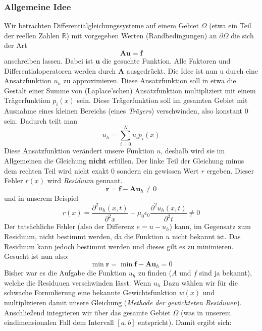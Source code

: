 	\subsubsection{Allgemeine Idee}
	Wir betrachten Differentialgleichungssysteme auf einem Gebiet $\Omega$ (etwa ein Teil der reellen Zahlen $\mathbb{R}$) mit vorgegeben Werten (Randbedingungen) an $\partial \Omega$ die sich der Art 
	\begin{equation}
		\mathbf{A}\mathbf{u}=\mathbf{f}
	\end{equation}
	anschreiben lassen. Dabei ist $\mathbf{u}$ die gesuchte Funktion. Alle Faktoren und Differentialoperatoren werden durch $\mathbf{A}$ ausgedrückt. 
	Die Idee ist nun u durch eine Ansatzfunktion $u_h$ zu approximieren.
	Diese Ansatzfunktion soll in etwa die Gestalt einer Summe von (Laplace'schen) Ansatzfunktion multipliziert mit einem Trägerfunktion $p_i(x)$ sein. Diese Trägerfunktion soll im gesamten Gebiet mit Ausnahme eines kleinen Bereichs (eines \textit{Trägers}) verschwinden, also konstant 0 sein. Dadurch teilt man 
	\begin{equation}
		u_h = \sum_{i=0}^N u_i p_i(x)
	\end{equation}
	Diese Ansatzfunktion verändert unsere Funktion $u$, deshalb wird sie im Allgemeinen die Gleichung \textbf{nicht} erfüllen. Der linke Teil der Gleichung minus dem rechten Teil wird nicht exakt 0 sondern ein gewissen Wert $r$ ergeben. Dieser Fehler $r(x)$ wird \textit{Residuum} gennant.
	\begin{equation}
	\mathbf{r} =\mathbf{f}-\mathbf{A}\mathbf{u}_h \neq 0 \tag{allgemein}
	\end{equation}
	und in unserem Beispiel
	\begin{equation}
		r(x) =\frac{\partial^2 u_h(x,t)}{\partial ^2 x} - \mu_0 \epsilon_0 \frac{\partial ^2 u_h (x,t)}{\partial^2 t} \neq 0 
	\end{equation}
	Der tatsächliche Fehler (also der Differenz  $e=u-u_h$) kann, im Gegensatz zum Residuum, nicht bestimmt werden, da die Funktion $u$ nicht bekannt ist. Das Residuum kann jedoch bestimmt werden und dieses gilt es zu minimieren. Gesucht ist nun also:
	\begin{equation}
		\min{\mathbf{r}} = \min{\mathbf{f}-\mathbf{A}\mathbf{u}_h} =  0  \tag{hoffentlich}
	\end{equation}
	Bisher war es die Aufgabe die Funktion $u_h$ zu finden ($A$ und $f$ sind ja bekannt), welche die Residuuen verschwinden lässt. Wenn $u_h$
	Dazu wählen wir für die schwache Formulierung eine bekannte Gewichtsfunktion $w(x)$ und multiplizieren damit unsere Gleichung (\textit{Methode der gewichteten Residuuen}). Anschließend integrieren wir über das gesamte Gebiet $\Omega$ (was in unserem eindimensionalen Fall dem Intervall $[a,b]$ entspricht). Damit ergibt sich: 
